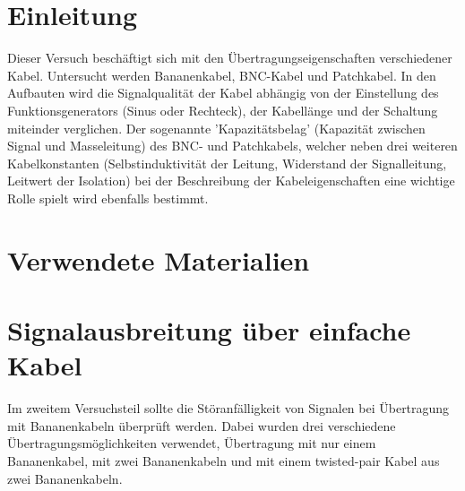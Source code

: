 \documentclass[12pt,a4paper]{article}
\begin{document}
\newpage\section{Einleitung}
Dieser Versuch beschäftigt sich mit den Übertragungseigenschaften verschiedener Kabel. Untersucht werden Bananenkabel, BNC-Kabel und Patchkabel.\newline
In den Aufbauten wird die Signalqualität der Kabel abhängig von der Einstellung des Funktionsgenerators (Sinus oder Rechteck), der Kabellänge und der Schaltung miteinder verglichen.\newline
Der sogenannte 'Kapazitätsbelag' (Kapazität zwischen Signal und Masseleitung) des BNC- und Patchkabels, welcher neben drei weiteren Kabelkonstanten (Selbstinduktivität der Leitung, Widerstand der Signalleitung, Leitwert der Isolation) bei der Beschreibung der Kabeleigenschaften eine wichtige Rolle spielt wird ebenfalls bestimmt.

\section{Verwendete Materialien}


\section{Signalausbreitung über einfache Kabel}
Im zweitem Versuchsteil sollte die Störanfälligkeit von Signalen bei Übertragung mit Bananenkabeln überprüft werden. Dabei wurden drei verschiedene Übertragungsmöglichkeiten verwendet, Übertragung mit nur einem Bananenkabel, mit zwei Bananenkabeln und mit einem twisted-pair Kabel aus zwei Bananenkabeln.
\end{document}
